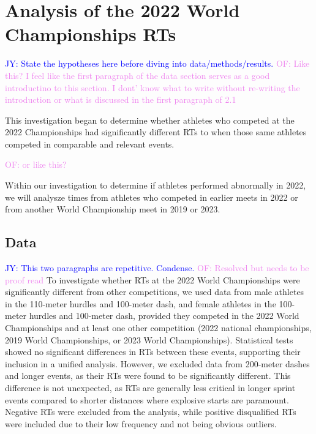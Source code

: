 \documentclass[12pt, letterpaper]{article}
\newcommand{\jy}[1]{\textcolor{blue}{JY: #1}}
\newcommand{\of}[1]{\textcolor{violet}{OF: #1}}
\begin{document}
\section{Analysis of the 2022 World Championships RTs}
\label{sec:problem1}

\jy{State the hypotheses here before diving into data/methods/results.}
\of{Like this?  I feel like the first paragraph of the data section serves as
a good introductino to this section. I dont' know what to write without
re-writing the introduction or what is discussed in the first paragraph of 2.1}

This investigation began to determine whether athletes who competed at the 2022
Championships had significantly different RTs to when those same athletes
competed in comparable and relevant events. 

\of{or like this?}

Within our investigation to determine if athletes performed abnormally in 2022,
we will analysze times from athletes who competed in earlier meets in 2022 
or from another World Championship meet in 2019 or 2023.

\subsection{Data}
\label{sec:data_2022}


\jy{This two paragraphs are repetitive. Condense.}
\of{Resolved but needs to be proof read}
To investigate whether RTs at the 2022 World Championships
were significantly different from other competitions, we
used data from male athletes in the 110-meter hurdles and 100-meter
dash, and female athletes in the 100-meter hurdles and 100-meter dash,
provided they competed in the 2022 World Championships and at least
one other competition (2022 national championships, 2019 World
Championships, or 2023 World Championships). Statistical tests showed no
significant differences in RTs between these events, supporting their
inclusion in a unified analysis. However, we excluded data from
200-meter dashes and longer events, as their RTs were found
to be significantly different. This difference is not unexpected, as
RTs are generally less critical in longer sprint events
compared to shorter distances where explosive starts are paramount.
Negative RTs were excluded from the analysis, while positive disqualified RTs
were included due to their low frequency and not being obvious outliers.

\end{document}
